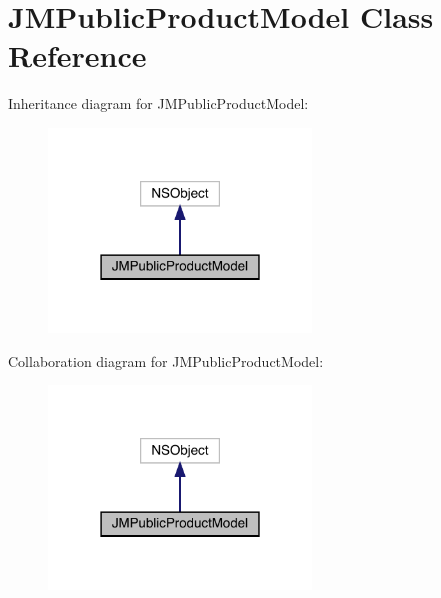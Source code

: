 \hypertarget{interface_j_m_public_product_model}{}\section{J\+M\+Public\+Product\+Model Class Reference}
\label{interface_j_m_public_product_model}


Inheritance diagram for J\+M\+Public\+Product\+Model\+:\nopagebreak
\begin{figure}[H]
\begin{center}
\leavevmode
\includegraphics[width=198pt]{interface_j_m_public_product_model__inherit__graph}
\end{center}
\end{figure}


Collaboration diagram for J\+M\+Public\+Product\+Model\+:\nopagebreak
\begin{figure}[H]
\begin{center}
\leavevmode
\includegraphics[width=198pt]{interface_j_m_public_product_model__coll__graph}
\end{center}
\end{figure}
